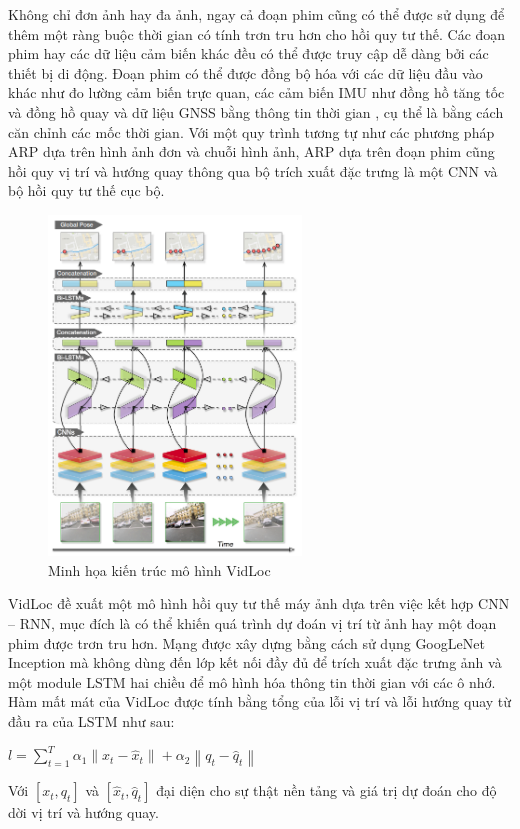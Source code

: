 Không chỉ đơn ảnh hay đa ảnh, ngay cả đoạn phim cũng có thể được sử dụng để thêm một ràng buộc thời gian có tính trơn tru hơn cho hồi quy tư thế. Các đoạn phim hay các dữ liệu cảm biến khác đều có thể được truy cập dễ dàng bởi các thiết bị di động. Đoạn phim có thể được đồng bộ hóa với các dữ liệu đầu vào khác như đo lường cảm biến trực quan, các cảm biến IMU như đồng hồ tăng tốc và đồng hồ quay và dữ liệu GNSS bằng thông tin thời gian , cụ thể là bằng cách căn chỉnh các mốc thời gian. Với một quy trình tương tự như các phương pháp ARP dựa trên hình ảnh đơn và chuỗi hình ảnh, ARP dựa trên đoạn phim cũng hồi quy vị trí và hướng quay thông qua bộ trích xuất đặc trưng là một CNN và bộ hồi quy tư thế cục bộ.
\begin{figure}[t]
    \centering
    \includegraphics[width=0.6\textwidth]{pics/Chapter2/vidloc.png}
    \caption{Minh họa kiến trúc mô hình VidLoc \cite{clark2017vidloc}}
\end{figure}
VidLoc \cite{clark2017vidloc} đề xuất một mô hình hồi quy tư thế máy ảnh dựa trên việc kết hợp CNN – RNN, mục đích là có thể khiến quá trình dự đoán vị trí từ ảnh hay một đoạn phim được trơn tru hơn. Mạng được xây dựng bằng cách sử dụng GoogLeNet Inception \cite{szegedy2014going} mà không dùng đến lớp kết nối đầy đủ để trích xuất đặc trưng ảnh và một module LSTM hai chiều để mô hình hóa thông tin thời gian với các ô nhớ.  Hàm mất mát của VidLoc được tính bằng tổng của lỗi vị trí và lỗi hướng quay từ đầu ra của LSTM như sau:
\begin{center}
    $ l = \sum_{t=1}^T \alpha_1 \left \| x_t - \hat{x}_t \right \| + \alpha_2 \left \| q_t - \hat{q}_t \right \| $
\end{center}
Với $[x_t, q_t]$ và $[\hat{x}_t, \hat{q}_t]$ đại diện cho sự thật nền tảng và giá trị dự đoán cho độ dời vị trí và hướng quay.

